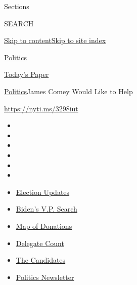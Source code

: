 Sections

SEARCH

\protect\hyperlink{site-content}{Skip to
content}\protect\hyperlink{site-index}{Skip to site index}

\href{https://www.nytimes.com/section/politics}{Politics}

\href{https://myaccount.nytimes.com/auth/login?response_type=cookie\&client_id=vi}{}

\href{https://www.nytimes.com/section/todayspaper}{Today's Paper}

\href{/section/politics}{Politics}\textbar{}James Comey Would Like to
Help

\url{https://nyti.ms/3298iut}

\begin{itemize}
\item
\item
\item
\item
\item
\item
\end{itemize}

\begin{itemize}
\item
  \href{https://www.nytimes.com/2020/07/31/us/elections/biden-vs-trump.html?action=click\&pgtype=Article\&state=default\&region=TOP_BANNER\&context=storylines_menu}{Election
  Updates}
\item
  \href{https://www.nytimes.com/article/biden-vice-president-2020.html?action=click\&pgtype=Article\&state=default\&region=TOP_BANNER\&context=storylines_menu}{Biden's
  V.P. Search}
\item
  \href{https://www.nytimes.com/interactive/2020/07/24/us/politics/trump-biden-campaign-donors.html?action=click\&pgtype=Article\&state=default\&region=TOP_BANNER\&context=storylines_menu}{Map
  of Donations}
\item
  \href{https://www.nytimes.com/interactive/2020/us/elections/delegate-count-primary-results.html?action=click\&pgtype=Article\&state=default\&region=TOP_BANNER\&context=storylines_menu}{Delegate
  Count}
\item
  \href{https://www.nytimes.com/interactive/2019/us/politics/2020-presidential-candidates.html?action=click\&pgtype=Article\&state=default\&region=TOP_BANNER\&context=storylines_menu}{The
  Candidates}
\item
  \href{https://www.nytimes.com/newsletters/politics?action=click\&pgtype=Article\&state=default\&region=TOP_BANNER\&context=storylines_menu}{Politics
  Newsletter}
\end{itemize}

